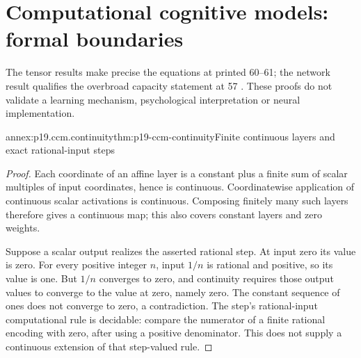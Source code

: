 \section{Computational cognitive models: formal boundaries}
\label{sec:p19-ccm-annex}

The tensor results make precise the equations at printed 60--61;
the network result qualifies the overbroad capacity statement at 57
\parencite{DoumasHummel2012HigherCognition}. These proofs do not validate
a learning mechanism, psychological interpretation or neural implementation.

\begin{annexitem}{annex:p19.ccm.continuity}{thm:p19-ccm-continuity}{Finite continuous layers and exact rational-input steps}
\begin{proof}
Each coordinate of an affine layer is a constant plus a finite sum
of scalar multiples of input coordinates, hence is continuous.
Coordinatewise application of continuous scalar activations is
continuous. Composing finitely many such layers therefore gives a
continuous map; this also covers constant layers and zero weights.

Suppose a scalar output realizes the asserted rational step.
At input zero its value is zero. For every positive integer \(n\),
input \(1/n\) is rational and positive, so its value is one.
But \(1/n\) converges to zero, and continuity requires those
output values to converge to the value at zero, namely zero.
The constant sequence of ones does not converge to zero, a
contradiction. The step's rational-input computational rule is
decidable: compare the numerator of a finite rational encoding with
zero, after using a positive denominator. This does not supply a
continuous extension of that step-valued rule.
\end{proof}
\end{annexitem}

